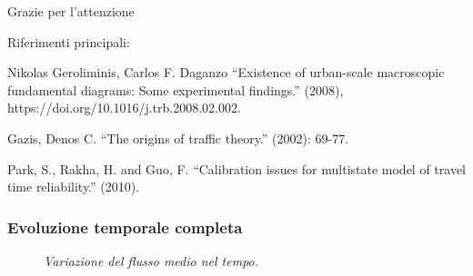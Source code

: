 \documentclass[
	11pt, %
]{beamer}
\begin{document}

\begin{frame}[plain] %
	\begin{center}
		{\Huge Grazie per l'attenzione}
		
		\bigskip\bigskip %
		
		{\LARGE Riferimenti principali:}
		
		\bigskip
		\small

		Nikolas Geroliminis, Carlos F. Daganzo ``Existence of urban-scale macroscopic fundamental diagrams: Some experimental findings.'' (2008), https://doi.org/10.1016/j.trb.2008.02.002.
		
		\bigskip
		
		Gazis, Denos C. ``The origins of traffic theory.'' (2002): 69-77.
		
		\bigskip
		
		Park, S., Rakha, H. and Guo, F. ``Calibration issues for multistate model of travel time reliability.'' (2010).
	\end{center}
\end{frame}

\begin{frame}[plain]{}
\end{frame}

\begin{frame}
	\frametitle{Evoluzione temporale completa}
	\centering
	\begin{figure}[H]
		\caption{\emph{Variazione del flusso medio nel tempo.}}
		\end{figure}
\end{frame}
\end{document}
